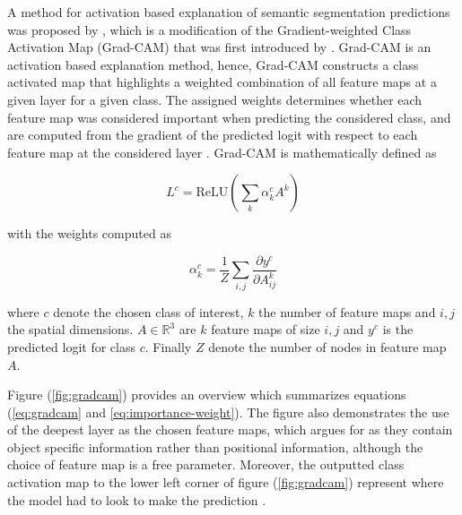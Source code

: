 \documentclass[../main/thesis.tex]{subfiles}
\begin{document}
A method for activation based explanation of semantic segmentation predictions was proposed by \citet{Vinogradova2020}, which is a modification of the Gradient-weighted Class Activation Map (Grad-CAM) that was first introduced by \citet{Selvaraju2016}. Grad-CAM is an activation based explanation method, hence, Grad-CAM constructs a class activated map that highlights a weighted combination of all feature maps at a given layer for a given class. The assigned weights determines whether each feature map was considered important when predicting the considered class, and are computed from the gradient of the predicted logit with respect to each feature map at the considered layer \citep{Selvaraju2016}. Grad-CAM is mathematically defined as

\begin{equation}
    \label{eq:gradcam}
    L^c = \text{ReLU}\left(\sum_k \alpha_k^c A^k\right)    
\end{equation}

with the weights computed as

\begin{equation}
    \label{eq:importance-weight}
    \alpha_k^c = \frac{1}{Z} \sum_{i,j} \frac{\partial{y^c}}{\partial{A_{ij}^k}}
\end{equation}

where $c$ denote the chosen class of interest, $k$ the number of feature maps and $i,j$ the spatial dimensions. $A \in \mathbb{R}^3$ are $k$ feature maps of size $i,j$ and $y^c$ is the predicted logit for class $c$. Finally $Z$ denote the number of nodes in feature map $A$. 

Figure (\ref{fig:gradcam}) provides an overview which summarizes equations (\ref{eq:gradcam} and \ref{eq:importance-weight}). The figure also demonstrates the use of the deepest layer as the chosen feature maps, which \citet{Selvaraju2016} argues for as they contain object specific information rather than positional information, although the choice of feature map is a free parameter. Moreover, the outputted class activation map to the lower left corner of figure (\ref{fig:gradcam}) represent where the model had to look to make the prediction \citep{Selvaraju2016}.
\end{document}
